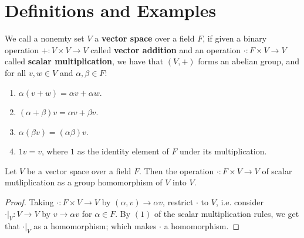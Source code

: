 
\section{Definitions and Examples}
\label{section1}

\begin{definition}
    We call a nonemty set $V$ a \textbf{vector space} over a field $F$, if given
    a binary operation  $+:V \times V \rightarrow V$ called \textbf{vector
    addition} and an operation $\cdot:F \times V \rightarrow V$ called
    \textbf{scalar multiplication}, we have that $(V,+)$ forms an abelian group,
    and for all $v,w \in V$ and  $\alpha,\beta \in F$:
     \begin{enumerate}[label=(\arabic*)]
         \item $\alpha(v+w)=\alpha v+\alpha w$.

         \item $ (\alpha+\beta)v=\alpha v+\beta v$.

         \item $\alpha(\beta v)=(\alpha\beta)v$.

         \item $1v=v$, where  $1$ as the identity element of  $F$ under its
             multiplication.
    \end{enumerate}
\end{definition}

\begin{lemma}\label{1.1.1}
    Let $V$ be a vector space over a field  $F$. Then the operation  $\cdot:F
    \times V \rightarrow V$ of scalar mutliplication as a group homomorphism of
    $V$ into  $V$.
\end{lemma}
\begin{proof}
    Taking $\cdot:F \times V \rightarrow V$ by $(\alpha,v) \rightarrow \alpha
    v$, restrict $\cdot$ to  $V$, i.e. consider $\cdot|_{V}:V \rightarrow V$ by
    $v \rightarrow \alpha v$ for $\alpha \in F$. By $(1)$ of the scalar
    multiplication rules, we get that $\cdot|_{V}$ as a homomorphism; which
    makes $\cdot$ a homomorphism.
\end{proof}

